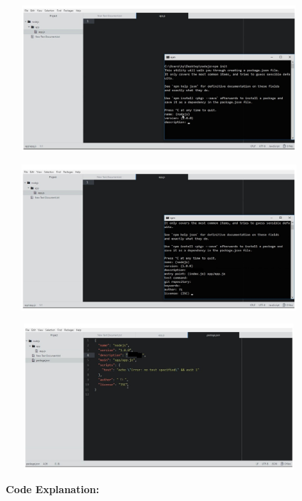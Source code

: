\documentclass[
]{article}
\begin{document}
\begin{center}
	\includegraphics*[width=4.48in, height=2.13in]{IMG-01-04}
\end{center}
\begin{center}
	\includegraphics*[width=4.48in, height=2.13in]{IMG-01-05}
\end{center}
\begin{center}
	\includegraphics*[width=4.48in, height=2.13in]{IMG-01-06}
\end{center}

{\textbf{Code Explanation:}}

{\textbf{}}\strut \\
\end{document}
